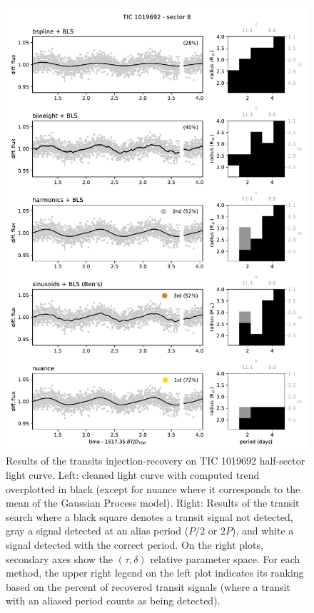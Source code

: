 \documentclass{aastex631}
\begin{document}
\begin{figure}
    \begin{centering}
        \includegraphics[width=0.8\linewidth]{../workflows/tess_injection_recovery/figures/searched/1019692.pdf}
        \caption{Results of the transits injection-recovery on TIC 1019692 half-sector light curve. Left: cleaned light curve with computed trend overplotted in black (except for \textsf{nuance} where it corresponds to the mean of the Gaussian Process model). Right: Results of the transit search where a black square denotes a transit signal not detected, gray a signal detected at an alias period ($P/2$ or $2P$), and  white a signal detected with the correct period. On the right plots, secondary axes show the $(\tau, \delta)$ relative parameter space. For each method, the upper right legend on the left plot indicates its ranking based on the percent of recovered transit signals (where a transit with an aliased period counts as being detected).
        }
        \label{fig:onesearch}
    \end{centering}
\end{figure}



\end{document}
